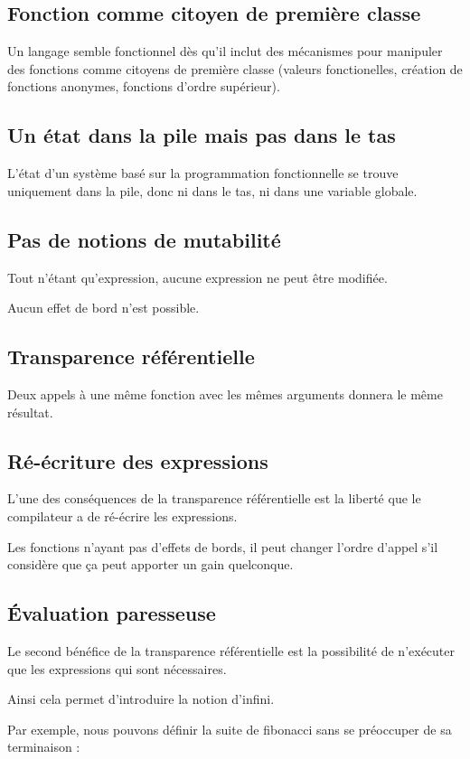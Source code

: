 \documentclass{article}
\begin{document}
\subsection{Fonction comme citoyen de première classe}
Un langage semble fonctionnel dès qu'il inclut des mécanismes pour manipuler des
fonctions comme citoyens de première classe (valeurs fonctionelles, création de
fonctions anonymes, fonctions d'ordre supérieur).

\subsection{Un état dans la pile mais pas dans le tas}
L'état d'un système basé sur la programmation fonctionnelle se trouve uniquement
dans la pile, donc ni dans le tas, ni dans une variable globale.

\subsection{Pas de notions de mutabilité}
Tout n'étant qu'expression, aucune expression ne peut être modifiée.

Aucun effet de bord n'est possible.

\subsection{Transparence référentielle}
Deux appels à une même fonction avec les mêmes arguments donnera le même résultat.

\subsection{Ré-écriture des expressions}
L'une des conséquences de la transparence référentielle est la liberté que le compilateur
a de ré-écrire les expressions.

Les fonctions n'ayant pas d'effets de bords, il peut changer l'ordre d'appel s'il
considère que ça peut apporter un gain quelconque.

\subsection{Évaluation paresseuse}
Le second bénéfice de la transparence référentielle est la possibilité de n'exécuter
que les expressions qui sont nécessaires.

Ainsi cela permet d'introduire la notion d'infini.

Par exemple, nous pouvons définir la suite de fibonacci sans se préoccuper de sa
terminaison :
\end{document}
